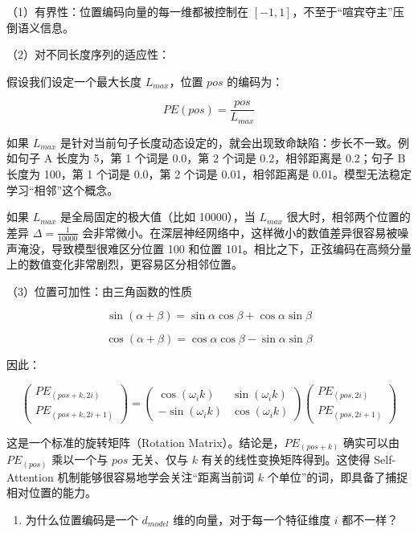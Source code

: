（1）有界性：位置编码向量的每一维都被控制在 \([-1,1]\)，不至于``喧宾夺主''压倒语义信息。

（2）对不同长度序列的适应性：

假设我们设定一个最大长度 \(L_{max}\)，位置 \(pos\) 的编码为：

\[
PE(pos)=\frac{pos}{L_{max}}
\]

如果 \(L_{max}\) 是针对当前句子长度动态设定的，就会出现致命缺陷：步长不一致。例如句子 A 长度为 5，第 1 个词是 0.0，第 2 个词是 0.2，相邻距离是 0.2；句子 B 长度为 100，第 1 个词是 0.0，第 2 个词是 0.01，相邻距离是 0.01。模型无法稳定学习``相邻''这个概念。

如果 \(L_{max}\) 是全局固定的极大值（比如 10000），当 \(L_{max}\) 很大时，相邻两个位置的差异 \(\Delta=\frac{1}{10000}\) 会非常微小。在深层神经网络中，这样微小的数值差异很容易被噪声淹没，导致模型很难区分位置 100 和位置 101。相比之下，正弦编码在高频分量上的数值变化非常剧烈，更容易区分相邻位置。

（3）位置可加性：由三角函数的性质

\[
\sin(\alpha+\beta)=\sin\alpha\cos\beta+\cos\alpha\sin\beta
\]

\[
\cos(\alpha+\beta)=\cos\alpha\cos\beta-\sin\alpha\sin\beta
\]

因此：

\[
\begin{pmatrix}
PE_{(pos+k,2i)} \\
PE_{(pos+k,2i+1)}
\end{pmatrix}
=
\begin{pmatrix}
\cos(\omega_i k) & \sin(\omega_i k) \\
-\sin(\omega_i k) & \cos(\omega_i k)
\end{pmatrix}
\begin{pmatrix}
PE_{(pos,2i)} \\
PE_{(pos,2i+1)}
\end{pmatrix}
\]

这是一个标准的旋转矩阵（Rotation Matrix）。结论是，\(PE_{(pos+k)}\) 确实可以由 \(PE_{(pos)}\) 乘以一个与 \(pos\) 无关、仅与 \(k\) 有关的线性变换矩阵得到。这使得 Self-Attention 机制能够很容易地学会关注``距离当前词 \(k\) 个单位''的词，即具备了捕捉相对位置的能力。

\begin{enumerate}
\def\labelenumi{\arabic{enumi}.}
\setcounter{enumi}{1}
\tightlist
\item
  为什么位置编码是一个 \(d_{model}\) 维的向量，对于每一个特征维度 \(i\) 都不一样？
\end{enumerate}

